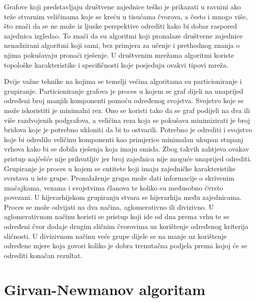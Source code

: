 \documentclass[times, utf8, diplomski]{fer}
\begin{document}
Grafove koji predstavljaju društvene zajednice teško je prikazati u ravnini ako teže stvarnim veličinama koje se kreću u tisućama čvorova, a često i mnogo više, što znači da se ne može iz ljuske perspektive odrediti kako bi dobar raspored zajednica izgledao. To znači da su algoritmi koji pronalaze društvene zajednice nenadzirani algoritmi koji sami, bez primjera za učenje i prethodnog znanja o njima pokušavaju pronaći rješenje. U društvenim mrežama algoritmi koriste topološke karakteristike i specifičnosti koje posjeduju ovakvi tipovi mreža. 

Dvije važne tehnike na kojima se temelji većina algoritama su particioniranje i grupiranje. Particioniranje grafova je proces u kojem se graf dijeli na unaprijed određeni broj manjih komponenti pomoću određenog svojstva. Svojstvo koje se može iskoristiti je minimalni rez. Ono se koristi tako da se graf podijeli na dva ili više razdvojenih podgrafova, a veličina reza koja se pokušava minimizirati je broj bridova koje je potrebno ukloniti da bi to ostvarili. Potrebno je odrediti i svojstvo koje bi odredilo veličinu komponenti kao primjerice minimalan ukupan stupanj vrhova kako bi se dobila rješenja koja imaju smisla. Zbog takvih zahtjeva ovakav pristup najčešće nije prihvatljiv jer broj zajednica nije moguće unaprijed odrediti.
Grupiranje je proces u kojem se entitete koji imaju zajedničke karakteristike svrstava u iste grupe. Pronalaženje grupa može dati informacije o skrivenim značajkama, vezama i svojstvima članova te koliko su međusobno čvrsto povezani. U hijerarhijskom grupiranju stvara se hijerarhija među zajednicama. Proces se može odvijati na dva načina, aglomerativno ili divizivno. U aglomerativnom načinu koristi se pristup koji ide od dna prema vrhu te se određeni čvor dodaje drugim sličnim čvorovima uz korištenje određenog kriterija sličnosti. U divizivnom načinu veće grupe dijele se na manje uz korištenje određene mjere koja govori koliko je dobra trenutačna podjela prema kojoj će se odrediti konačan rezultat.



\section{Girvan-Newmanov algoritam}
\end{document}
